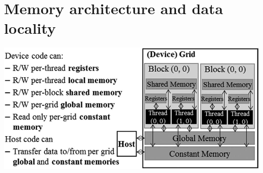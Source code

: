 \chapter{Memory architecture and data locality}
\begin{center}
      \includegraphics[width=0.8\linewidth]{Images/Memories/memory_types.png}
\end{center}
